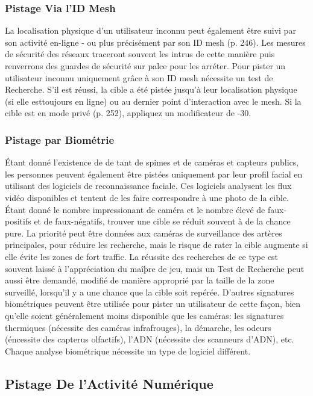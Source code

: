 \subsubsection{Pistage Via l'ID Mesh} 

La localisation physique d'un utilisateur inconnu peut également être suivi par son activité en-ligne - ou plus précisément par son ID mesh (p. 246). Les mesures de sécurité des réseaux traceront souvent les intrus de cette manière puis renverrons des guardes de sécurité sur palce pour les arréter. Pour pister un utilisateur inconnu uniquement grâce à son ID mesh nécessite un test de Recherche. S'il est réussi, la cible a été pistée jusqu'à leur localisation physique (si elle esttoujours en ligne) ou au dernier point d'interaction avec le mesh. Si la cible est en mode privé (p. 252), appliquez un modificateur de -30. 

\subsubsection{Pistage par Biométrie} 

Étant donné l'existence de de tant de spimes et de caméras et capteurs publics, les personnes peuvent également être pistées uniquement par leur profil facial en utilisant des logiciels de reconnaissance faciale. Ces logiciels analysent les flux vidéo disponibles et tentent de les faire correspondre à une photo de la cible. Étant donné le nombre impressionant de caméra et le nombre élevé de faux-positifs et de faux-négatifs, trouver une cible se réduit souvent à de la chance pure. La priorité peut être données aux caméras de surveillance des artères principales, pour réduire les recherche, mais le risque de rater la cible augmente si elle évite les zones de fort traffic. La réussite des recherches de ce type est souvent laissé à l'appréciation du maîþre de jeu, mais un Test de Recherche peut aussi être demandé, modifié de manière approprié par la taille de la zone surveillé, lorsqu'il y a une chance que la cible soit repérée. D'autres signatures biométriques peuvent être utilisée pour pister un utilisateur de cette façon, bien qu'elle soient généralement moins disponible que les caméras: les signatures thermiques (nécessite des caméras infrafrouges), la démarche, les odeurs (éncessite des capterus olfactifs), l'ADN (nécessite des scanneurs d'ADN), etc. Chaque analyse biométrique nécessite un type de logiciel différent. 



\subsection{Pistage De l'Activité Numérique} 

